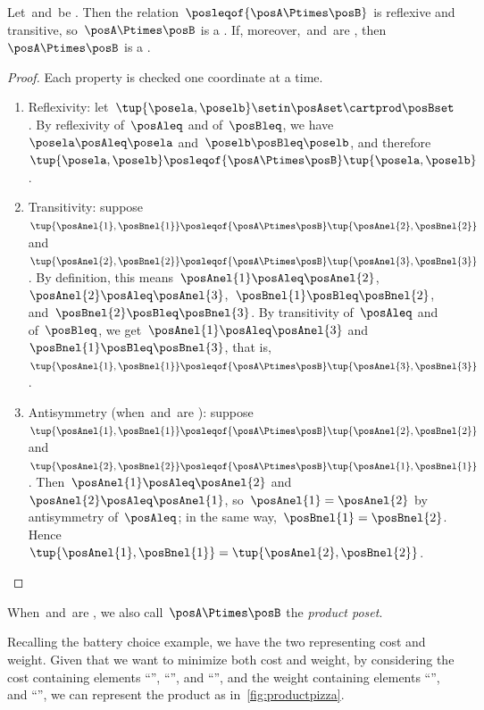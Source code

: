 \begin{lemma}
    \label{lem:product-preorder}
    Let~\posA and~\posB be .
    Then the relation~$\posleqof{\posA\Ptimes \posB}$ is reflexive and transitive, so~$\posA\Ptimes \posB$ is a .
    If, moreover,~\posA and~\posB are , then~$\posA\Ptimes \posB$ is a .
\end{lemma}
\begin{proof}
    Each property is checked one coordinate at a time.
    \begin{enumerate}
        \item Reflexivity: let~$\tup{\posela, \poselb}\setin \posAset \cartprod \posBset$.
        By reflexivity of~$\posAleq$ and of~$\posBleq$, we have~$\posela \posAleq \posela$ and~$\poselb \posBleq \poselb$, and therefore~$\tup{\posela, \poselb} \posleqof{\posA\Ptimes \posB} \tup{\posela, \poselb}$.
        \item Transitivity: suppose~$\tup{\posAnel{1}, \posBnel{1}} \posleqof{\posA\Ptimes \posB} \tup{\posAnel{2}, \posBnel{2}}$ and~$\tup{\posAnel{2}, \posBnel{2}} \posleqof{\posA\Ptimes \posB} \tup{\posAnel{3}, \posBnel{3}}$.
        By definition, this means~$\posAnel{1} \posAleq \posAnel{2}$,~$\posAnel{2} \posAleq \posAnel{3}$,~$\posBnel{1} \posBleq \posBnel{2}$, and~$\posBnel{2} \posBleq \posBnel{3}$.
        By transitivity of~$\posAleq$ and of~$\posBleq$, we get~$\posAnel{1} \posAleq \posAnel{3}$ and~$\posBnel{1} \posBleq \posBnel{3}$, that is,~$\tup{\posAnel{1}, \posBnel{1}} \posleqof{\posA\Ptimes \posB} \tup{\posAnel{3}, \posBnel{3}}$.
        \item Antisymmetry (when~\posA and~\posB are ): suppose~$\tup{\posAnel{1}, \posBnel{1}} \posleqof{\posA\Ptimes \posB} \tup{\posAnel{2}, \posBnel{2}}$ and~$\tup{\posAnel{2}, \posBnel{2}} \posleqof{\posA\Ptimes \posB} \tup{\posAnel{1}, \posBnel{1}}$.
        Then~$\posAnel{1} \posAleq \posAnel{2}$ and~$\posAnel{2} \posAleq \posAnel{1}$, so~$\posAnel{1} = \posAnel{2}$ by antisymmetry of~$\posAleq$; in the same way,~$\posBnel{1} = \posBnel{2}$.
        Hence~$\tup{\posAnel{1}, \posBnel{1}} = \tup{\posAnel{2}, \posBnel{2}}$.
    \end{enumerate}
\end{proof}
When~\posA and~\posB are , we also call~$\posA\Ptimes \posB$ the \emph{product poset}.

Recalling the battery choice example, we have the two  representing cost and weight.
Given that we want to minimize both cost and weight, by considering the cost  containing elements ``\poscheap'', ``\posmidrange'', and ``\posexpensive'', and the weight  containing elements ``\poslight'', and ``\posheavy'', we can represent the product as in~\cref{fig:productpizza}.

